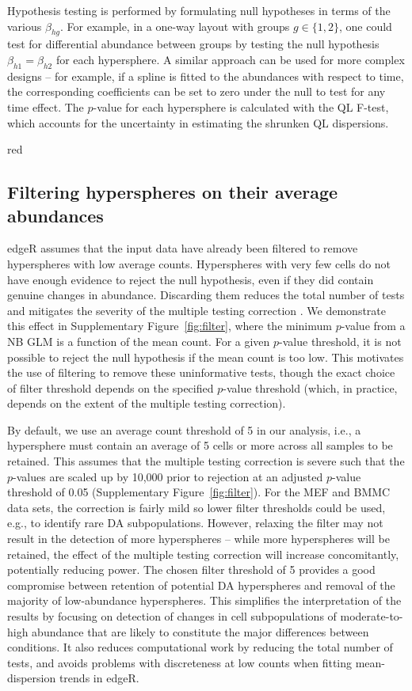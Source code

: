 \documentclass{article}
\begin{document}
Hypothesis testing is performed by formulating null hypotheses in terms of the various $\beta_{hg}$.
For example, in a one-way layout with groups $g\in\{1,2\}$, one could test for differential abundance between groups by testing the null hypothesis $\beta_{h1}=\beta_{h2}$ for each hypersphere.
A similar approach can be used for more complex designs -- for example, if a spline is fitted to the abundances with respect to time, the corresponding coefficients can be set to zero under the null to test for any time effect.
The $p$-value for each hypersphere is calculated with the QL F-test, which accounts for the uncertainty in estimating the shrunken QL dispersions. 

\begin{color}{red}
\subsection{Filtering hyperspheres on their average abundances}
edgeR assumes that the input data have already been filtered to remove hyperspheres with low average counts.
Hyperspheres with very few cells do not have enough evidence to reject the null hypothesis, even if they did contain genuine changes in abundance.
Discarding them reduces the total number of tests and mitigates the severity of the multiple testing correction \cite{bourgon2010independent}.
We demonstrate this effect in Supplementary Figure~\ref{fig:filter}, where the minimum $p$-value from a NB GLM is a function of the mean count.
For a given $p$-value threshold, it is not possible to reject the null hypothesis if the mean count is too low.
This motivates the use of filtering to remove these uninformative tests, though the exact choice of filter threshold depends on the specified $p$-value threshold (which, in practice, depends on the extent of the multiple testing correction).

By default, we use an average count threshold of 5 in our analysis, i.e., a hypersphere must contain an average of 5 cells or more across all samples to be retained.
This assumes that the multiple testing correction is severe such that the $p$-values are scaled up by 10,000 prior to rejection at an adjusted $p$-value threshold of 0.05 (Supplementary Figure~\ref{fig:filter}). 
For the MEF and BMMC data sets, the correction is fairly mild so lower filter thresholds could be used, e.g., to identify rare DA subpopulations.
However, relaxing the filter may not result in the detection of more hyperspheres -- while more hyperspheres will be retained, the effect of the multiple testing correction will increase concomitantly, potentially reducing power.
The chosen filter threshold of 5 provides a good compromise between retention of potential DA hyperspheres and removal of the majority of low-abundance hyperspheres.
This simplifies the interpretation of the results by focusing on detection of changes in cell subpopulations of moderate-to-high abundance that are likely to constitute the major differences between conditions.
It also reduces computational work by reducing the total number of tests, and avoids problems with discreteness at low counts when fitting mean-dispersion trends in edgeR.
\end{color}
\end{document}
